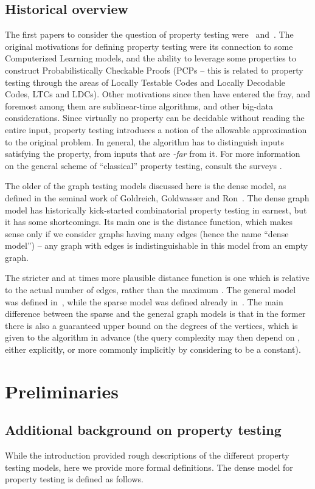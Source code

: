 \documentclass[11pt]{article}
\begin{document}
\subsection{Historical overview}
The first papers to consider the question of property testing were~\cite{BLR93} and~\cite{RS96}.
The original motivations for defining property testing were its connection to some Computerized
Learning models, and the ability to leverage some properties to construct Probabilistically
Checkable Proofs (PCPs -- this is related to property testing through the areas of Locally Testable
Codes and Locally Decodable Codes, LTCs and LDCs). Other motivations since then have entered the
fray, and foremost among them are sublinear-time algorithms, and other big-data considerations.
Since virtually no property can be decidable without reading the entire input, property testing
introduces a notion of the allowable approximation to the original problem. In general, the
algorithm has to distinguish inputs satisfying the property, from inputs that are {\em
-far} from it.  For more information on the general scheme of ``classical'' property
testing, consult the surveys \cite{Ron08,Fischer,GR10}.

The older of the graph testing models discussed here is the dense model, as defined in the seminal work of Goldreich, Goldwasser and Ron~\cite{GGR98}.
The dense graph model has historically kick-started combinatorial property testing in earnest, but it has some shortcomings. Its main one is the distance function, which makes sense only if we consider graphs having many edges (hence the name ``dense model'') -- any graph with  edges is indistinguishable in this model from an empty graph.

The stricter and at times more plausible distance function is one which is relative to the actual number of edges, rather than the maximum . The general model was defined in~\cite{AKKR}, while the sparse model was defined already in~\cite{GoldreichR02}.
The main difference between the sparse and the general graph models is that in the former there is also a guaranteed upper bound  on the degrees of the vertices, which is given to the algorithm in advance (the query complexity may then depend on , either explicitly, or more commonly implicitly by considering  to be a constant).


\section{Preliminaries}
\label{sec:prelim}
\subsection{Additional background on property testing}
While the introduction provided rough descriptions of the different property testing models, here we provide more formal definitions. The dense model for property testing is defined as follows.
\end{document}
